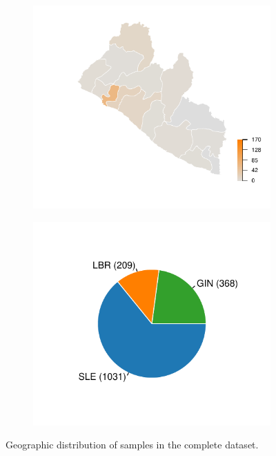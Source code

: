 \begin{figure}[!p]
\begin{subfigure}[b]{0.45\textwidth}
		\end{subfigure}		
		\\
		\begin{subfigure}[b]{0.45\textwidth}
			\centering
			\includegraphics[width=\columnwidth]{figures/complete-geo-3}
		\end{subfigure}		
		\hfill
		\begin{subfigure}[b]{0.45\textwidth}
			\centering
			\includegraphics[width=\columnwidth]{figures/complete-geo-4}
		\end{subfigure}		
		\caption{Geographic distribution of samples in the complete dataset.}
		\label{fig:seqdata_complete_geo}
	\end{figure}


